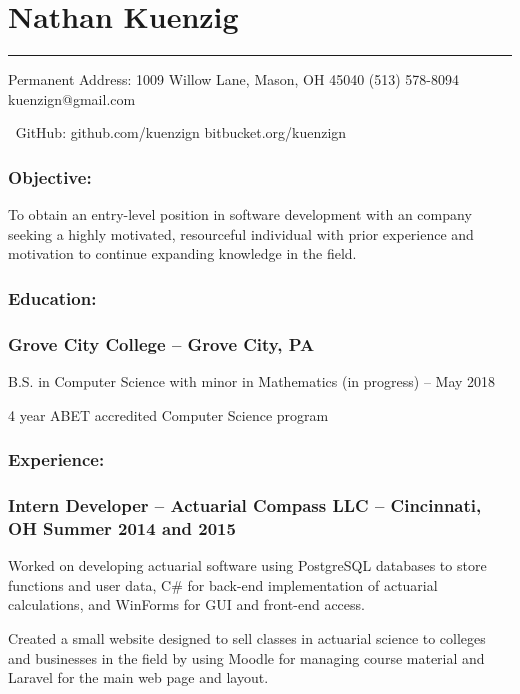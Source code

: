 \documentclass[12pt]{article}
\begin{document}
{
\centering\section*{\color{head}Nathan Kuenzig}
\vspace{-7mm}
\noindent\color{head2}\rule{\textwidth}{1pt}

{\footnotesize {\color{accent}Permanent Address:} 1009 Willow Lane, Mason, OH 45040  (513) 578-8094  kuenzign@gmail.com

{\color{accent}\faGithub $\:$ GitHub:} github.com/kuenzign  bitbucket.org/kuenzign}

}
\vspace{-5mm}
\subsubsection*{\color{head}Objective:}
\small To obtain an entry-level position in software development with an company seeking a highly motivated, resourceful individual with prior experience and motivation to continue expanding knowledge in the field.

\subsubsection*{\color{head}Education:}
\subsubsection*{\textnormal{{\color{accent} Grove City College }\color{head} -- Grove City, PA}}
\vspace{-2mm}
\noindent\hspace{2.25pc} B.S. in Computer Science with minor in Mathematics (in progress) -- May 2018

\noindent\hspace{2.25pc} 4 year ABET accredited Computer Science program

\subsubsection*{\color{head}Experience:}
\subsubsection*{\textnormal{{\color{accent} Intern Developer }\color{head} -- Actuarial Compass LLC -- Cincinnati, OH	\hfill Summer 2014 and 2015}}
\vspace{-2mm}
\begin{compactitem}
	\item Worked on developing actuarial software using PostgreSQL databases to store functions and user data, C\# for back-end implementation of actuarial calculations, and WinForms for GUI and front-end access.
	\item Created a small website designed to sell classes in actuarial science to colleges and businesses in the field by using Moodle for managing course material and Laravel for the main web page and layout.
\end{compactitem}
\vspace{-4.5mm}
\end{document}
